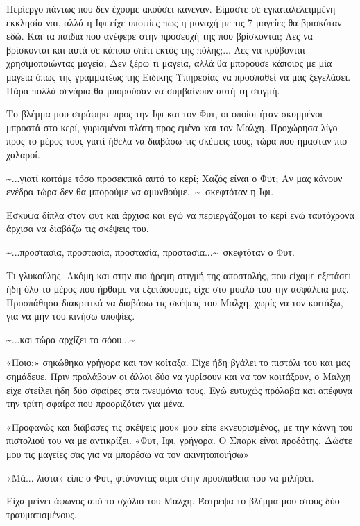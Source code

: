 \documentclass[12pt,twoside, openany]{book}
\begin{document}
Περίεργο πάντως που δεν έχουμε ακούσει κανέναν. Είμαστε σε εγκαταλελειμμένη εκκλησία ναι, αλλά η Ιφι είχε υποψίες πως η μοναχή με τις 7 μαγείες θα βρισκόταν εδώ. Και τα παιδιά που ανέφερε στην προσευχή της που βρίσκονται; Λες να βρίσκονται και αυτά σε κάποιο σπίτι εκτός της πόλης;... Λες να κρύβονται χρησιμοποιώντας μαγεία; Δεν ξέρω τι μαγεία, αλλά θα μπορούσε κάποιος με μία μαγεία όπως της γραμματέως της Ειδικής Υπηρεσίας να προσπαθεί να μας ξεγελάσει. Πάρα πολλά σενάρια θα μπορούσαν να συμβαίνουν αυτή τη στιγμή.

Το βλέμμα μου στράφηκε προς την Ιφι και τον Φυτ, οι οποίοι ήταν σκυμμένοι μπροστά στο κερί, γυρισμένοι πλάτη προς εμένα και τον Μαλχη. Προχώρησα λίγο προς το μέρος τους γιατί ήθελα να διαβάσω τις σκέψεις τους, τώρα που ήμασταν πιο χαλαροί.

\textasciitilde ...γιατί κοιτάμε τόσο προσεκτικά αυτό το κερί; Χαζός είναι ο Φυτ; Αν μας κάνουν ενέδρα τώρα δεν θα μπορούμε να αμυνθούμε...\textasciitilde \  σκεφτόταν η Ιφι.

Έσκυψα δίπλα στον φυτ και άρχισα και εγώ να περιεργάζομαι το κερί ενώ ταυτόχρονα άρχισα να διαβάζω τις σκέψεις του.

\textasciitilde ...προστασία, προστασία, προστασία, προστασία...\textasciitilde \  σκεφτόταν ο Φυτ.

Τι γλυκούλης. Ακόμη και στην πιο ήρεμη στιγμή της αποστολής, που είχαμε εξετάσει ήδη όλο το μέρος που ήρθαμε να εξετάσουμε, είχε στο μυαλό του την ασφάλεια μας. Προσπάθησα διακριτικά να διαβάσω τις σκέψεις του Μαλχη, χωρίς να τον κοιτάξω, για να μην του κινήσω υποψίες.

\textasciitilde ...και τώρα αρχίζει το σόου...\textasciitilde 

«Ποιο;» σηκώθηκα γρήγορα και τον κοίταξα. Είχε ήδη βγάλει το πιστόλι του και μας σημάδευε. Πριν προλάβουν οι άλλοι δύο να γυρίσουν και να τον κοιτάξουν, ο Μαλχη είχε στείλει ήδη δύο σφαίρες στα πνευμόνια τους. Εγώ ευτυχώς πρόλαβα και απέφυγα την τρίτη σφαίρα που προοριζόταν για μένα.

«Προφανώς και διάβασες τις σκέψεις μου» μου είπε εκνευρισμένος, με την κάννη του πιστολιού του να με αντικρίζει. «Φυτ, Ιφι, γρήγορα. Ο Σπαρκ είναι προδότης. Δώστε μου τις μαγείες σας για να μπορέσω να τον ακινητοποιήσω»

«Μά... λιστα» είπε ο Φυτ, φτύνοντας αίμα στην προσπάθεια του να μιλήσει.

Είχα μείνει άφωνος από το σχόλιο του Μαλχη. Έστρεψα το βλέμμα μου στους δύο τραυματισμένους. 
\end{document}
